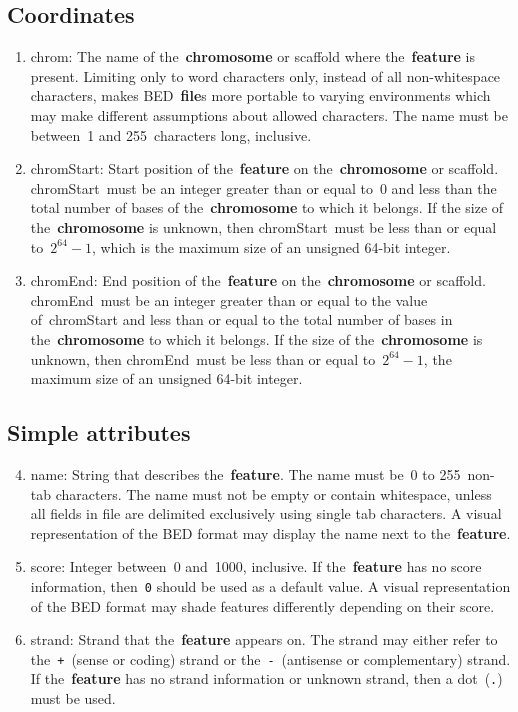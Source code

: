 \documentclass[11pt]{article}
\begin{document}
\subsection{Coordinates}
\begin{enumerate}
\item \textsf{chrom}: The name of the~\textbf{chromosome} or scaffold where the~\textbf{feature} is present.
  Limiting only to word characters only, instead of all non-whitespace characters, makes \ac{BED}~\textbf{file}s more portable to varying environments which may make different assumptions about allowed characters.
  The name must be between~1 and 255~characters long, inclusive.

\item \textsf{chromStart}: Start position of the~\textbf{feature} on the~\textbf{chromosome} or scaffold.
  \textsf{chromStart}~must be an integer greater than or equal to~0 and less than the total number of bases of the~\textbf{chromosome} to which it belongs.
  If the size of the~\textbf{chromosome} is unknown, then \textsf{chromStart}~must be less than or equal to~$2^{64} - 1$, which is the maximum size of an unsigned 64-bit integer.

\item \textsf{chromEnd}: End position of the~\textbf{feature} on the~\textbf{chromosome} or scaffold.
  \textsf{chromEnd}~must be an integer greater than or equal to the value of~\textsf{chromStart} and less than or equal to the total number of bases in the~\textbf{chromosome} to which it belongs.
  If the size of the~\textbf{chromosome} is unknown, then \textsf{chromEnd}~must be less than or equal to~$2^{64} - 1$, the maximum size of an unsigned 64-bit integer.
\end{enumerate}

\subsection{Simple attributes}
\begin{enumerate}
  \setcounter{enumi}{3}

\item \textsf{name}: String that describes the~\textbf{feature}.
  The name must be~0 to 255~non-tab characters.
  The name must not be empty or contain whitespace, unless all fields in file are delimited exclusively using single tab characters.
  A visual representation of the \ac{BED} format may display the name next to the~\textbf{feature}.

\item \textsf{score}: Integer between~0 and~1000, inclusive.
  If the~\textbf{feature} has no score information, then~\texttt{0} should be used as a default value.
  A visual representation of the \ac{BED} format may shade features differently depending on their score.

\item \textsf{strand}: Strand that the~\textbf{feature} appears on.
  The strand may either refer to the~\texttt{+}~(sense or coding) strand or the~\texttt{-}~(antisense or complementary) strand.
  If the~\textbf{feature} has no strand information or unknown strand, then a dot~(\texttt{.}) must be used.
\end{enumerate}
\end{document}
